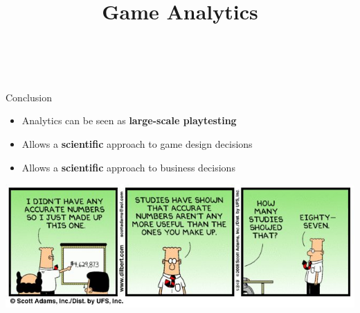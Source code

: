\usepackage{../../beamerthemeFalmouthGamesAcademy}
\usepackage{multimedia}
\graphicspath{ {../../} }


\usepackage[normalem]{ulem}
\usepackage{wasysym}

\usepackage{pdfpages}

\usetikzlibrary{arrows,automata}




\title{Game Analytics}
\subtitle{\modulecode\ \moduletitle}

\frame{\titlepage}






%




\begin{frame}{Conclusion}
	\begin{itemize}
		\pause\item Analytics can be seen as \textbf{large-scale playtesting}
		\pause\item Allows a \textbf{scientific} approach to game design decisions
		\pause\item Allows a \textbf{scientific} approach to business decisions
	\end{itemize}
\end{frame}

\begin{frame}
	\begin{center}
		\includegraphics[width=\textwidth]{dilbert}
	\end{center}
\end{frame}


